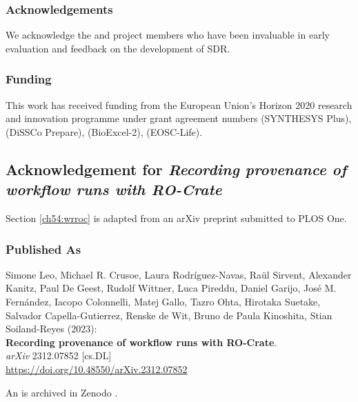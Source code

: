 \subsubsection*{Acknowledgements}

We acknowledge the  and
 project members who have been
invaluable in early evaluation and feedback on the development of SDR.

\subsubsection*{Funding}

This work has received funding from the European Union's Horizon 2020
research and innovation programme under grant agreement numbers
(SYNTHESYS Plus),  (DiSSCo
Prepare),  (BioExcel-2),
 (EOSC-Life).



\subsection{Acknowledgement for \emph{Recording provenance of workflow runs with RO-Crate}}
\label{ch11:wrroc}

Section \vref{ch54:wrroc} is adapted from an arXiv preprint submitted to PLOS One.

\subsubsection*{Published As}

Simone Leo, Michael R. Crusoe, Laura Rodríguez-Navas, Raül Sirvent, Alexander Kanitz, Paul De Geest, Rudolf Wittner, Luca Pireddu, Daniel Garijo, José M. Fernández, Iacopo Colonnelli, Matej Gallo, Tazro Ohta, Hirotaka Suetake, Salvador Capella-Gutierrez, Renske de Wit, Bruno de Paula Kinoshita, Stian Soiland-Reyes (2023): \\
\textbf{Recording provenance of workflow runs with RO-Crate}.\\
\emph{arXiv} 2312.07852 [cs.DL] \\
\url{https://doi.org/10.48550/arXiv.2312.07852}

An  is archived in Zenodo \cite{wrroc-crate}.


